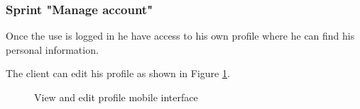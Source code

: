 \documentclass[12pt,a4paper]{report}
\begin{document}
\subsubsection*{Sprint "Manage account"}
Once the use is logged in he have access to his own profile where he can find his personal information.\par
The client can edit his profile as shown in Figure \ref{manageaccount-label}.
\begin{figure}[H]
	\centering
	\vspace*{1in}
	\qquad
	\caption{View and edit profile mobile interface}%
	\label{manageaccount-label}%
\end{figure}
\end{document}
